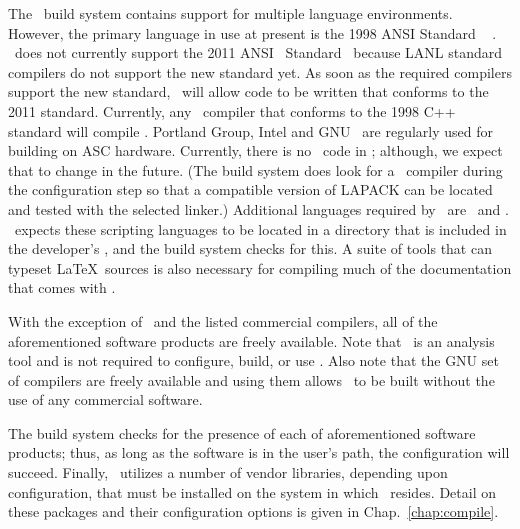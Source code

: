 The \draco\ build system contains support for multiple language
environments.  However, the primary language in use at present is the 1998 ANSI
Standard \cpp~\cite{ansi:cpp} .  \draco\ does not currently support the 2011 ANSI \cpp\ Standard~\cite{ansi:cpp11} because LANL standard compilers do not support the new standard yet.  As soon as the required compilers support the new standard, \draco\ will allow code to be written that conforms to the 2011 standard. Currently, any \cpp\ compiler that conforms to the 1998 C++ standard will compile \draco.  Portland Group, Intel and GNU \cpp\ are regularly used for building on ASC hardware. 
Currently, there
is no \fortran\ code in \draco; although, we expect that to change in
the future.  (The build system does look for a \fortran\ compiler during the configuration step so that a compatible version of LAPACK can be located and tested with the selected linker.)
Additional languages required by \draco\ are \python\ and 
.  \draco\ expects these scripting
languages to be located in a directory that is included in the developer's ,
and the build system checks for this.   A suite of tools that can typeset \LaTeX\ sources is also
necessary for compiling much of the documentation that comes with \draco.
  

With the exception of \bullseye\ and the listed commercial compilers, all of the
aforementioned software products are freely available.  Note that \bullseye\ is  an
analysis tool and is not required to configure, build, or use
\draco.  Also note that the GNU set of compilers are freely available and using them allows \draco\ to be built without the use of any commercial software.

The build system checks for the presence of each of aforementioned software products; thus, as
long as the software is in the user's path, the configuration will
succeed.  Finally, \draco\ utilizes a number of vendor libraries,
depending upon configuration, that must be installed on the system in
which \draco\ resides.  Detail on these packages and their
configuration options is given in Chap.~\ref{chap:compile}.

